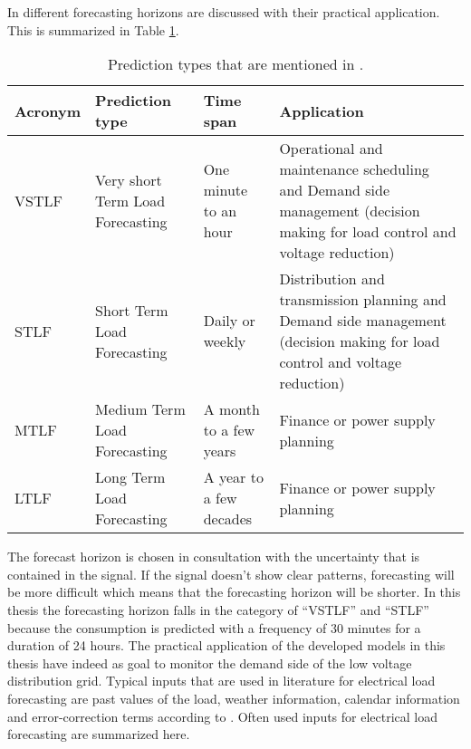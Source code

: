 In \cite{NarjesFallah2018} different forecasting horizons are discussed with their practical application. This is summarized in Table \ref{tab:prediciontypes}.

\begin{table}[h!]
	\centering
	\begin{tabular}{@{}lp{3cm}p{3cm}p{4.5cm}@{}} \toprule
		\textbf{Acronym}	& \textbf{Prediction type} & \textbf{Time span} & \textbf{Application}\\\midrule
		VSTLF	& Very short Term Load Forecasting	& One minute to an hour	& Operational and maintenance
		scheduling and Demand side management
		(decision making for load
		control and voltage reduction)\\\hline		
		STLF	&	Short Term Load Forecasting 	& 	Daily or weekly		& Distribution and transmission
		planning and Demand side management
		(decision making for load
		control and voltage reduction)\\\hline	
		MTLF	&	Medium Term Load Forecasting	& A month to a few years	& Finance or power supply planning\\\hline
		LTLF	&	Long Term Load Forecasting	&	A year to a few decades	&	Finance or power supply planning\\\bottomrule
	\end{tabular}
	\caption{Prediction types that are mentioned in \cite{NarjesFallah2018}.}
	\label{tab:prediciontypes}
\end{table}

The forecast horizon is chosen in consultation with the uncertainty that is contained in the signal. If the signal doesn't show clear patterns, forecasting will be more difficult which means that the forecasting horizon will be shorter. In this thesis the forecasting horizon falls in the category of ``VSTLF'' and ``STLF'' because the consumption is predicted with a frequency of 30 minutes for a duration of 24 hours. The practical application of the developed models in this thesis have indeed as goal to monitor the demand side of the low voltage distribution grid.
Typical inputs that are used in literature for electrical load forecasting are past values of the load, weather information, calendar information and error-correction terms according to \cite{loadforecastingmoor}. Often used inputs for electrical load forecasting are summarized here.

